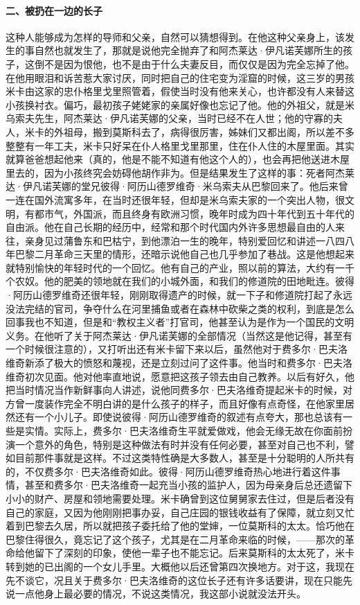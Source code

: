 \paragraph*{二、被扔在一边的长子}
\par 这种人能够成为怎样的导师和父亲，自然可以猜想得到。在他这种父亲身上，该发生的事自然也就发生了，那就是说他完全抛弃了和阿杰莱达·伊凡诺芙娜所生的孩子，这倒不是因为恨他，也不是由于什么夫妻反目，而仅仅是因为完全忘掉了他。在他用眼泪和诉苦惹大家讨厌，同时把自己的住宅变为淫窟的时候，这三岁的男孩米卡由这家的忠仆格里戈里照管着，假使当时没有他来关心，也许都没有人来替这小孩换衬衣。偏巧，最初孩子姥姥家的亲属好像也忘记了他。他的外祖父，就是米乌索夫先生，阿杰莱达·伊凡诺芙娜的父亲，当时已经不在人世；他的守寡的夫人，米卡的外祖母，搬到莫斯科去了，病得很厉害，姊妹们又都出阁，所以差不多整整有一年工夫，米卡只好呆在仆人格里戈里那里，住在仆人住的木屋里面。其实就算爸爸想起他来（真的，他是不能不知道有他这个人的），也会再把他送进木屋里去的，因为小孩终究会妨碍他胡作非为。但是结果发生了这样的事：死者阿杰莱达·伊凡诺芙娜的堂兄彼得·阿历山德罗维奇·米乌索夫从巴黎回来了。他后来曾一连在国外流寓多年，在当时还很年轻，但却是米乌索夫家的一个突出人物，很文明，有都市气，外国派，而且终身有欧洲习惯，晚年时成为四十年代到五十年代的自由派。他在自己长期的经历中，经常和那个时代国内外许多思想最自由的人来往，亲身见过蒲鲁东和巴枯宁，到他漂泊一生的晚年，特别爱回忆和讲述一八四八年巴黎二月革命三天里的情形，还暗示说他自己也几乎参加了巷战。这是他想起来就特别愉快的年轻时代的一个回忆。他有自己的产业，照以前的算法，大约有一千个农奴。他的肥美的领地就在我们的小城外面，和我们的修道院的田地毗连。彼得·阿历山德罗维奇还很年轻，刚刚取得遗产的时候，就一下子和修道院打起了永远没法完结的官司，争夺什么在河里捕鱼或者在森林中砍柴之类的权利，到底是怎么回事我也不知道，但是和“教权主义者”打官司，他甚至认为是作为一个国民的文明义务。在他听了关于阿杰莱达·伊凡诺芙娜的全部情况（当然这是他记得，甚至有一个时候很注意的），又打听出还有米卡留下来以后，虽然他对于费多尔·巴夫洛维奇新添了极大的愤怒和蔑视，还是立刻过问了这件事。他当时和费多尔·巴夫洛维奇初次见面。他对他率直地说，愿意把这孩子领去由自己教养。以后有好久，他把当时情况当作新鲜事向人讲述，说他同费多尔·巴夫洛维奇提起米卡的时候，对方曾一度装作完全不明白讲的是什么孩子的样子，而且好像有点奇怪，在他家里居然还有一个小儿子。即使说彼得·阿历山德罗维奇的叙述有点夸大，那也总该有一些是实情。实际上，费多尔·巴夫洛维奇生平就爱做戏，他会无缘无故在你面前扮演一个意外的角色，特别是这种做法有时并没有任何必要，甚至对自己也不利，譬如目前那件事就是这样。不过这类特性确是大多数人，甚至是十分聪明的人所共有的，不仅费多尔·巴夫洛维奇如此。彼得·阿历山德罗维奇热心地进行着这件事情，甚至和费多尔·巴夫洛维奇一起充当小孩的监护人，因为母亲身后总还遗留下小小的财产、房屋和领地需要处理。米卡确曾到这位舅舅家去住过，但是后者没有自己的家庭，又因为他刚刚把事办妥，自己庄园的银钱收益有了保障，就立刻又忙着到巴黎去久居，所以就把孩子委托给了他的堂婶，一位莫斯科的太太。恰巧他在巴黎住得很久，竟忘记了这个孩子，尤其是在二月革命来临的时候，——那次的革命给他留下了深刻的印象，使他一辈子也不能忘记。后来莫斯科的太太死了，米卡转到她的已出阁的一个女儿手里。大概他以后还曾第四次换地方。对于这，我现在先不谈它，况且关于费多尔·巴夫洛维奇的这位长子还有许多话要讲，现在只能先说一点他身上最必要的情况，不说这类情况，我这部小说就没法开头。
